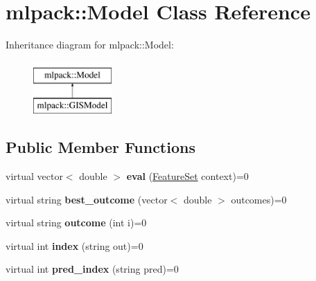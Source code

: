 \hypertarget{classmlpack_1_1_model}{
\section{mlpack::Model Class Reference}
\label{classmlpack_1_1_model}
}
Inheritance diagram for mlpack::Model:\begin{figure}[H]
\begin{center}
\leavevmode
\includegraphics[height=2.000000cm]{classmlpack_1_1_model}
\end{center}
\end{figure}
\subsection*{Public Member Functions}
\begin{DoxyCompactItemize}
\item 
\hypertarget{classmlpack_1_1_model_a62004f99ecc70455338ccf206533787b}{
virtual vector$<$ double $>$ {\bfseries eval} (\hyperlink{structmlpack_1_1_feature_set}{FeatureSet} context)=0}
\label{classmlpack_1_1_model_a62004f99ecc70455338ccf206533787b}

\item 
\hypertarget{classmlpack_1_1_model_a6c991c3a264b14cc7ba25ccaba07017d}{
virtual string {\bfseries best\_\-outcome} (vector$<$ double $>$ outcomes)=0}
\label{classmlpack_1_1_model_a6c991c3a264b14cc7ba25ccaba07017d}

\item 
\hypertarget{classmlpack_1_1_model_a2dd8ed20b28dcbfd157d5d0a2cae4585}{
virtual string {\bfseries outcome} (int i)=0}
\label{classmlpack_1_1_model_a2dd8ed20b28dcbfd157d5d0a2cae4585}

\item 
\hypertarget{classmlpack_1_1_model_a6f9e4c74633a589343031571c0fc7db9}{
virtual int {\bfseries index} (string out)=0}
\label{classmlpack_1_1_model_a6f9e4c74633a589343031571c0fc7db9}

\item 
\hypertarget{classmlpack_1_1_model_a188aad4207f178e2ff01ca018df35471}{
virtual int {\bfseries pred\_\-index} (string pred)=0}
\label{classmlpack_1_1_model_a188aad4207f178e2ff01ca018df35471}

\end{DoxyCompactItemize}
